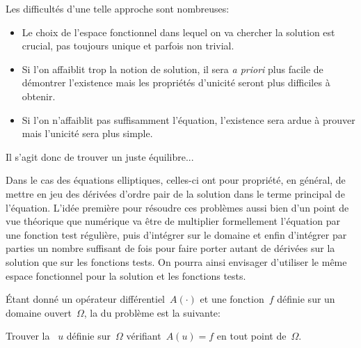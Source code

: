 \medskip



Les difficultés d'une telle approche sont nombreuses:
\begin{itemize}
  \item Le choix de l'espace fonctionnel dans lequel on va chercher la solution est crucial,
	pas toujours unique et parfois non trivial.
  \item Si l'on affaiblit trop la notion de solution, il sera \emph{a priori} plus facile de démontrer l'existence
	mais les propriétés d'unicité seront plus difficiles à obtenir.
  \item Si l'on n'affaiblit pas suffisamment l'équation, l'existence sera ardue à prouver mais
	l'unicité sera plus simple.
\end{itemize}


\medskip



Il s'agit donc de trouver un juste équilibre...

Dans le cas des équations elliptiques, celles-ci ont pour propriété, en général, de mettre en jeu
des dérivées d'ordre pair de la solution dans le terme principal de l'équation.
L'idée première pour résoudre ces problèmes aussi bien d'un point de vue théorique
que numérique va être de multiplier formellement l'équation par une fonction test régulière,
puis d'intégrer sur le domaine et enfin d'intégrer par parties un nombre suffisant de fois pour
faire porter autant de dérivées sur la solution que sur les fonctions tests.
On pourra ainsi envisager d'utiliser le même espace fonctionnel pour la solution et les
fonctions tests.






\bigskip


%
%
Étant donné un opérateur différentiel~$A(\cdot)$ et une fonction~$f$ définie sur un domaine
ouvert~$\Omega$, la  du problème est la suivante:
\begin{center}
  Trouver la ~$u$ définie sur~$\Omega$ vérifiant~$A(u)=f$ en tout point de~$\Omega$.
\end{center}

